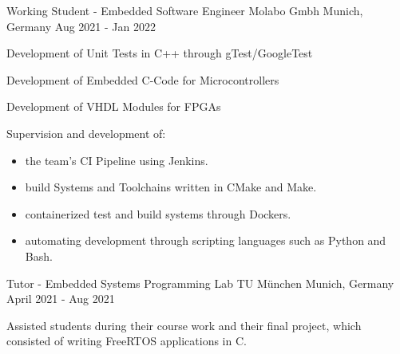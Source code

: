 
\begin{cventries}
  \cventry
    {Working Student - Embedded Software Engineer} %
    {Molabo Gmbh} %
    {Munich, Germany} %
    {Aug 2021 - Jan 2022} %
    {
      \begin{cvitems} %
        \item {Development of Unit Tests in C++ through gTest/GoogleTest}
        \item {Development of Embedded C-Code for Microcontrollers}
        \item {Development of VHDL Modules for FPGAs}
        \item {Supervision and development of:}
          \begin{itemize}
            \item {the team's CI Pipeline using Jenkins.}
            \item {build Systems and Toolchains written in CMake and Make.}
            \item {containerized test and build systems through Dockers.}
            \item {automating development through scripting languages such as Python and Bash.}
          \end{itemize}
      \end{cvitems}
    }


  \cventry
    {Tutor - Embedded Systems Programming Lab} %
    {TU München} %
    {Munich, Germany} %
    {April 2021 - Aug 2021} %
    {
      \begin{cvitems} %
        \item {Assisted students during their course work and their final project, which consisted of writing FreeRTOS applications in C.}
      \end{cvitems}
    }


\end{cventries}
